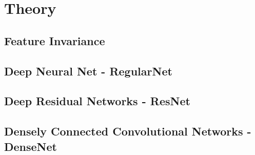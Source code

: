 \chapter{Theory}
\label{chp:theory}

\section{Feature Invariance}
\section{Deep Neural Net - RegularNet}
\section{Deep Residual Networks - ResNet}
\section{Densely Connected Convolutional Networks - DenseNet}